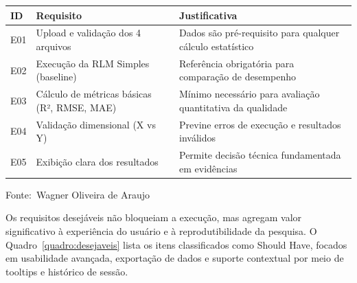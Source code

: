 \documentclass[12pt,a4paper]{article}
\newcommand{\oautor}{Wagner Oliveira de Araujo}
\begin{document}
\begin{quadro}[ht]
\centering
\small
\caption{Requisitos essenciais do sistema (Must Have)}
\label{quadro:essenciais}
\begin{threeparttable}
\begin{tabularx}{\textwidth}{|l|X|X|} \hline
\textbf{ID} & \textbf{Requisito} & \textbf{Justificativa} \\ \hline
E01 & Upload e validação dos 4 arquivos & Dados são pré-requisito para qualquer cálculo estatístico \\ \hline
E02 & Execução da RLM Simples (baseline) & Referência obrigatória para comparação de desempenho \\ \hline
E03 & Cálculo de métricas básicas (R², RMSE, MAE) & Mínimo necessário para avaliação quantitativa da qualidade \\ \hline
E04 & Validação dimensional (X vs Y) & Previne erros de execução e resultados inválidos \\ \hline
E05 & Exibição clara dos resultados & Permite decisão técnica fundamentada em evidências \\ \hline
\end{tabularx}
\begin{tablenotes}[flushleft]
\footnotesize
\item Fonte:~\oautor
\end{tablenotes}
\end{threeparttable}
\end{quadro}

Os requisitos desejáveis não bloqueiam a execução, mas agregam valor significativo à experiência do usuário e à reprodutibilidade da pesquisa. O Quadro~\ref{quadro:desejaveis} lista os itens classificados como Should Have, focados em usabilidade avançada, exportação de dados e suporte contextual por meio de tooltips e histórico de sessão.
\end{document}

